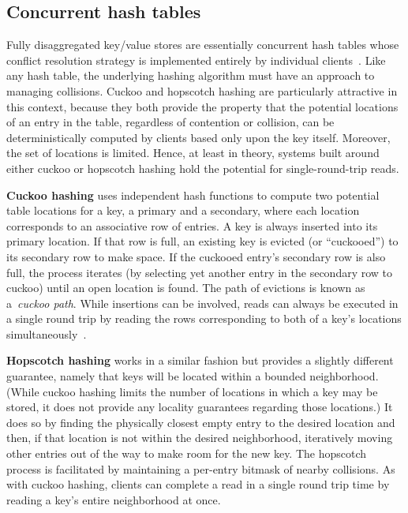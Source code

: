 \subsection{Concurrent hash tables} 
\label{sec:cuckoo-back}

Fully disaggregated key/value stores are essentially concurrent hash
tables whose conflict resolution strategy is implemented entirely by
individual clients~\cite{rolex,fusee,race}.  Like any hash table, the
underlying hashing algorithm must have an approach to managing
collisions. Cuckoo and hopscotch hashing are particularly attractive
in this context, because they both provide the property that the
potential locations of an entry in the table, regardless of
contention or collision, can be deterministically computed by clients
based only upon the key itself.  Moreover, the set of locations is
limited.  Hence, at least in theory, systems built around either
cuckoo or hopscotch hashing hold the potential for single-round-trip
reads.


\textbf{Cuckoo hashing} uses independent hash functions to compute two
potential table locations for a key, a primary and a secondary, where
each location corresponds to an associative row of entries.  A key is
always inserted into its primary location.  If that row is full, an
existing key is evicted (or ``cuckooed'') to its secondary row to make
space. If the cuckooed entry's secondary row is also full, the process
iterates (by selecting yet another entry in the secondary row to
cuckoo) until an open location is found. The path of evictions is
known as a~\textit{cuckoo path}.  While insertions can be involved,
reads can always be executed in a single round trip by reading the
rows corresponding to both of a key's locations
simultaneously~\cite{pilaf}.

\textbf{Hopscotch hashing} works in a similar fashion but provides a
slightly different guarantee, namely that keys will be located within
a bounded neighborhood.  (While cuckoo hashing limits the number of
locations in which a key may be stored, it does not provide any
locality guarantees regarding those locations.) It does so by finding
the physically closest empty entry to the desired location and then,
if that location is not within the desired neighborhood, iteratively
moving other entries out of the way to make room for the new key.
The hopscotch process is facilitated by maintaining a per-entry
bitmask of nearby collisions.  As with cuckoo hashing, clients can complete a read in a single round trip time by reading a key's entire
neighborhood at once.

